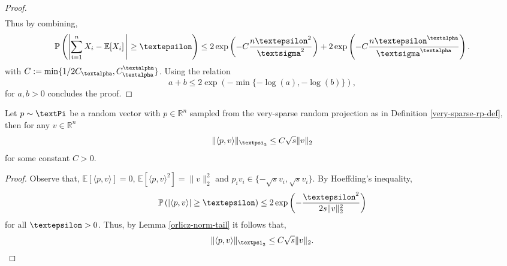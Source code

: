 \documentclass[openany]{book}
\begin{document}
\begin{lemma}
\begin{proof}
\begin{equation*}
\begin{split}
    \end{split}
\end{equation*}
Thus by combining,
\begin{equation*}
     \mathbb P\left(\left\vert\sum_{i=1}^nX_i-\mathbb E[X_i]\,\right\vert\geq \gepsilon\right)\leq 2\exp\left(-C\frac{n\gepsilon^2}{\gsigma^2}\right) + 2\exp\left(-C\frac{n\gepsilon^{\galpha}}{\gsigma^{\galpha}}\right).
\end{equation*}
with $C:=\min\{1/2C_{\galpha},C_{\galpha}^{\galpha}\}$. Using the relation 
\begin{equation*}
    a+b \leq 2\exp(-\min\{-\log (a),-\log (b)\}),
\end{equation*}
for $a,b>0$ concludes the proof.
\end{proof}
\end{lemma}
\begin{lemma}\label{vs-trp-sp-bound}
Let $p\sim \gPi$ be a random vector with $p\in\mathbb R^n$ sampled from the very-sparse random projection as in Definition \ref{very-sparse-rp-def}, then for any $v\in \mathbb R^n$
\begin{equation*}
    \|\langle p,v\rangle\|_{\gpsi_2}\leq C \sqrt{s}\|v\|_2
\end{equation*}
for some constant $C>0$.
\begin{proof}
    Observe that, $\mathbb E\left[\langle p,v\rangle\right]=0$, $\mathbb E\left[\langle p,v\rangle ^2\right]=\|v\|_2^2$ and $p_iv_i\in\{-\sqrt{s}v_i, \sqrt{s}v_i\}$. By Hoeffding's inequality,
    \begin{equation*}
        \mathbb P\left(\left\vert \langle p,v\rangle \right\vert \geq \gepsilon\right)\leq 2\exp\left(-\frac{\gepsilon^2}{2s\|v\|_2^2}\right)
    \end{equation*}
    for all $\gepsilon>0$. Thus, by Lemma \ref{orlicz-norm-tail} it follows that,
    \begin{equation*}
        \|\langle p,v\rangle \|_{\gpsi_2}\leq C\sqrt{s}\|v\|_2.\qedhere
    \end{equation*}
\end{proof}
\end{lemma}
\end{document}
